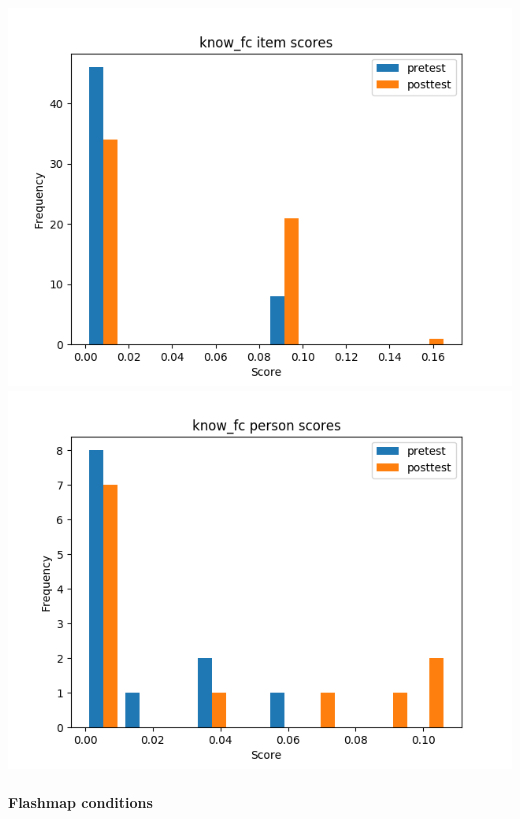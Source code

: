 \documentclass[]{article}
\begin{document}
\includegraphics{know_fc_diff.png} \includegraphics{know_fc_abil.png}

\FloatBarrier
\paragraph{Flashmap conditions}\label{flashmap-conditions-3}
\end{document}

